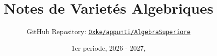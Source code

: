 

\title{Notes de Varietés Algebriques}
\author{GitHub Repository:
\href{https://github.com/Oxke/appunti/tree/main/AlgebraSuperiore}{\texttt{Oxke/appunti/AlgebraSuperiore}}}

\date{1er periode, 2026 \-- 2027,}


\maketitle

\tableofcontents





